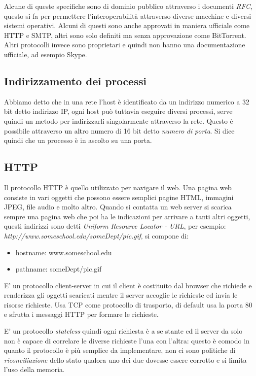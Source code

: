 Alcune di queste specifiche sono di dominio pubblico attraverso i documenti \emph{RFC}, questo si fa per permettere l'interoperabilità attraverso diverse macchine e diversi sistemi operativi. Alcuni di questi sono anche approvati in maniera ufficiale come HTTP e SMTP, altri sono solo definiti ma senza approvazione come BitTorrent.
Altri protocolli invece sono proprietari e quindi non hanno una documentazione ufficiale, ad esempio Skype.

\subsection{Indirizzamento dei processi}
Abbiamo detto che in una rete l'host è identificato da un indirizzo numerico a 32 bit detto indirizzo IP, ogni host può tuttavia eseguire diversi processi, serve quindi un metodo per indirizzarli singolarmente attraverso la rete.
Questo è possibile attraverso un altro numero di 16 bit detto \emph{numero di porta}.
Si dice quindi che un processo è in ascolto su una porta.

\subsection{HTTP}
Il protocollo HTTP è quello utilizzato per navigare il web.
Una pagina web consiste in vari oggetti che possono essere semplici pagine HTML, immagini JPEG, file audio e molto altro.
Quando si contatta un web server si scarica sempre una pagina web che poi ha le indicazioni per arrivare a tanti altri oggetti, questi indirizzi sono detti \emph{Uniform Resource Locator - URL}, per esempio: \emph{http://www.someschool.edu/someDept/pic.gif}, si compone di:
\begin{itemize}
    \item hostname: www.someschool.edu
    \item pathname: someDept/pic.gif
\end{itemize}

E' un protocollo client-server in cui il client è costituito dal browser che richiede e renderizza gli oggetti scaricati mentre il server accoglie le richieste ed invia le risorse richieste.
Usa TCP come protocollo di trasporto, di default usa la porta 80 e sfrutta i messaggi HTTP per formare le richieste.

E' un protocollo \emph{stateless} quindi ogni richiesta è a se stante ed il server da solo non è capace di correlare le diverse richieste l'una con l'altra: questo è comodo in quanto il protocollo è più semplice da implementare, non ci sono politiche di \emph{riconciliazione} dello stato qualora uno dei due dovesse essere corrotto e si limita l'uso della memoria.

